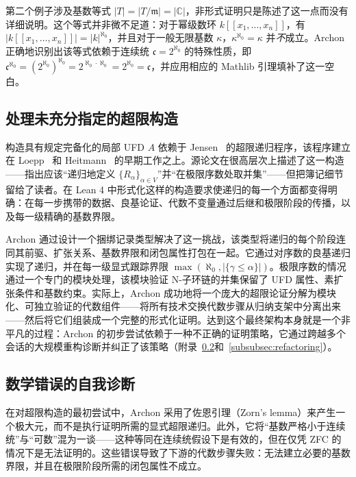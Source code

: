 ﻿\documentclass[]{pkuai4m}
\theoremstyle{plain}
\theoremstyle{definition}
\begin{document}
第二个例子涉及基数等式 $|T| = |T/\mathfrak{m}| = |\mathbb{C}|$，非形式证明只是陈述了这一点而没有详细说明。这个等式并非微不足道：对于幂级数环 $k[[x_1, \ldots, x_n]]$，有 $|k[[x_1, \ldots, x_n]]| = |k|^{\aleph_0}$，并且对于一般无限基数 $\kappa$，$\kappa^{\aleph_0} = \kappa$ 并\emph{不}成立。Archon 正确地识别出该等式依赖于连续统 $\mathfrak{c} = 2^{\aleph_0}$ 的特殊性质，即 $\mathfrak{c}^{\aleph_0} = (2^{\aleph_0})^{\aleph_0} = 2^{\aleph_0 \cdot \aleph_0} = 2^{\aleph_0} = \mathfrak{c}$，并应用相应的 Mathlib 引理填补了这一空白。

\subsection{处理未充分指定的超限构造}\label{subsubsec:transfinite}

构造具有规定完备化的局部 UFD $A$ 依赖于 Jensen~\cite{jensen2006completions} 的超限递归程序，该程序建立在 Loepp~\cite{loepp1997constructing} 和 Heitmann~\cite{heitmann1993characterization} 的早期工作之上。源论文在很高层次上描述了这一构造——指出应该“递归地定义 $\{R_\alpha\}_{\alpha \in V}$”并“在极限序数处取并集”——但把簿记细节留给了读者。在 Lean 4 中形式化这样的构造要求使递归的每一个方面都变得明确：在每一步携带的数据、良基论证、代数不变量通过后继和极限阶段的传播，以及每一级精确的基数界限。

Archon 通过设计一个捆绑记录类型解决了这一挑战，该类型将递归的每个阶段连同其前驱、扩张关系、基数界限和闭包属性打包在一起。它通过对序数的良基递归实现了递归，并在每一级显式跟踪界限 $\max(\aleph_0, |\{\gamma \le \alpha\}|)$。极限序数的情况通过一个专门的模块处理，该模块验证 N-子环链的并集保留了 UFD 属性、素扩张条件和基数约束。实际上，Archon 成功地将一个庞大的超限论证分解为模块化、可独立验证的代数组件——将所有技术交换代数步骤从归纳支架中分离出来——然后将它们组装成一个完整的形式化证明。达到这个最终架构本身就是一个非平凡的过程：Archon 的初步尝试依赖于一种不正确的证明策略，它通过跨越多个会话的大规模重构诊断并纠正了该策略（附录~\ref{subsubsec:self-diagnosis}和~\ref{subsubsec:refactoring}）。

\subsection{数学错误的自我诊断}\label{subsubsec:self-diagnosis}

在对超限构造的最初尝试中，Archon 采用了佐恩引理（Zorn's lemma）来产生一个极大元，而不是执行证明所需的显式超限递归。此外，它将“基数严格小于连续统”与“可数”混为一谈——这种等同在连续统假设下是有效的，但在仅凭 ZFC 的情况下是无法证明的。这些错误导致了下游的代数步骤失败：无法建立必要的基数界限，并且在极限阶段所需的闭包属性不成立。
\end{document}
